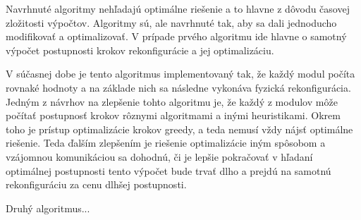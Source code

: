 \documentclass[
  digital, %
  oneside, %
  table,   %
  lof,     %
  nolot,     %
]{fithesis3}
\begin{document}
Navrhnuté algoritmy nehľadajú optimálne riešenie a to hlavne z dôvodu časovej zložitosti výpočtov. Algoritmy sú, ale navrhnuté tak, aby sa dali jednoducho modifikovať a optimalizovať. V prípade prvého algoritmu ide hlavne o samotný výpočet postupnosti krokov rekonfigurácie a jej optimalizáciu. 

V súčasnej dobe je tento algoritmus implementovaný tak, že každý modul počíta rovnaké hodnoty a na základe nich sa následne vykonáva fyzická rekonfigurácia. Jedným z návrhov na zlepšenie tohto algoritmu je, že každý z modulov môže počítať postupnosť krokov rôznymi algoritmami a inými heuristikami. Okrem toho je prístup optimalizácie krokov greedy, a teda nemusí vždy nájsť optimálne riešenie. Teda ďalším zlepšením je riešenie optimalizácie iným spôsobom a vzájomnou komunikáciou sa dohodnú, či je lepšie pokračovať v hľadaní optimálnej postupnosti tento výpočet bude trvať dlho a prejdú na samotnú rekonfiguráciu za cenu dlhšej postupnosti. 

Druhý algoritmus...


\printbibliography[heading=bibintoc] %
\end{document}
